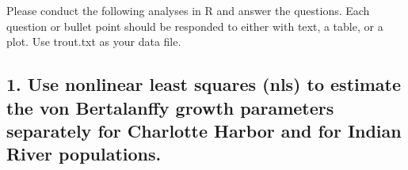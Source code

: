 \documentclass[
]{article}
\newenvironment{Shaded}{\begin{snugshade}}{\end{snugshade}}
\newcommand{\KeywordTok}[1]{\textcolor[rgb]{0.13,0.29,0.53}{\textbf{#1}}}
\newcommand{\NormalTok}[1]{#1}
\newcommand{\OperatorTok}[1]{\textcolor[rgb]{0.81,0.36,0.00}{\textbf{#1}}}
\newcommand{\StringTok}[1]{\textcolor[rgb]{0.31,0.60,0.02}{#1}}
\begin{document}
Please conduct the following analyses in R and answer the questions.
Each question or bullet point should be responded to either with text, a
table, or a plot. Use trout.txt as your data file.

\hypertarget{use-nonlinear-least-squares-nls-to-estimate-the-von-bertalanffy-growth-parameters-separately-for-charlotte-harbor-and-for-indian-river-populations.}{%
\subsection{1. Use nonlinear least squares (nls) to estimate the von
Bertalanffy growth parameters separately for Charlotte Harbor and for
Indian River
populations.}\label{use-nonlinear-least-squares-nls-to-estimate-the-von-bertalanffy-growth-parameters-separately-for-charlotte-harbor-and-for-indian-river-populations.}}

\begin{Shaded}
\end{Shaded}
\end{document}
